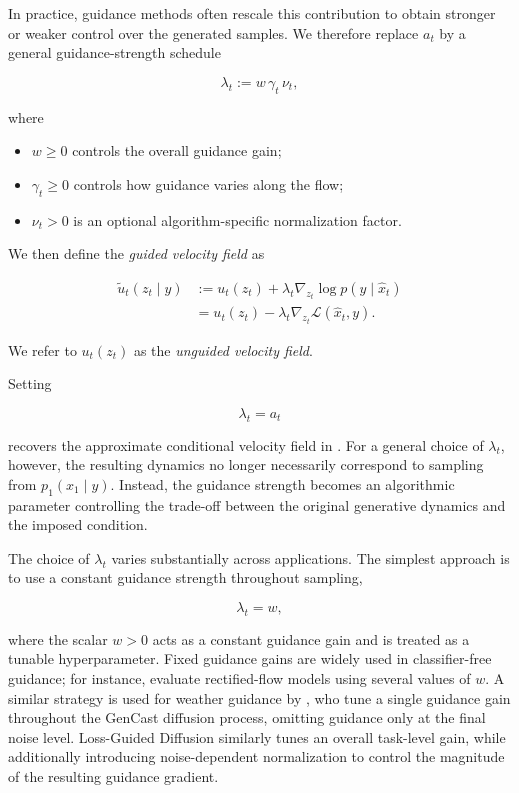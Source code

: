 In practice, guidance methods often rescale this contribution to obtain
stronger or weaker control over the generated samples.
We therefore replace $a_t$ by a general guidance-strength schedule

\begin{equation}
    \lambda_t
    :=
    w\,\gamma_t\,\nu_t,
    \label{eq:guidance-strength-schedule}
\end{equation}

where

\begin{itemize}[noitemsep]
    \item $w \geq 0$ controls the overall guidance gain;
    \item $\gamma_t \geq 0$ controls how guidance varies along the flow;
    \item $\nu_t > 0$ is an optional algorithm-specific normalization factor.
\end{itemize}

We then define the \emph{guided velocity field} as

\begin{align}
    \tilde{u}_t(z_t\mid y)
    &:=
    u_t(z_t)
    +
    \lambda_t
    \nabla_{z_t}\log p(y\mid\hat{x}_t)
    \\
    &=
    u_t(z_t)
    -
    \lambda_t
    \nabla_{z_t}\mathcal{L}(\hat{x}_t,y).
    \label{eq:guided-velocity}
\end{align}

We refer to $u_t(z_t)$ as the \emph{unguided velocity field}.

Setting

\[
    \lambda_t=a_t
\]

recovers the approximate conditional velocity field in
.
For a general choice of $\lambda_t$, however, the resulting dynamics no
longer necessarily correspond to sampling from $p_1(x_1\mid y)$.
Instead, the guidance strength becomes an algorithmic parameter controlling
the trade-off between the original generative dynamics and the imposed
condition.

The choice of $\lambda_t$ varies substantially across applications.
The simplest approach is to use a constant guidance strength throughout
sampling,

\begin{equation}
    \lambda_t = w,
    \label{eq:constant-guidance-schedule}
\end{equation}

where the scalar $w>0$ acts as a constant guidance gain and is treated as a
tunable hyperparameter.
Fixed guidance gains are widely used in classifier-free guidance; for
instance, \textcite{esser2024scaling} evaluate rectified-flow models using
several values of $w$.
A similar strategy is used for weather guidance by
\textcite{ueyama2026guided}, who tune a single guidance gain throughout the
GenCast diffusion process, omitting guidance only at the final noise level.
Loss-Guided Diffusion \parencite{song2023lossguided} similarly tunes an
overall task-level gain, while additionally introducing noise-dependent
normalization to control the magnitude of the resulting guidance gradient.

